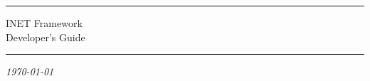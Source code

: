 

\begin{center}\end{center}
\vspace{16em}
\hrule
\vspace{2em}
\begin{center}
{\HUGE INET Framework}\\
\vspace{2em}
{\Huge Developer's Guide}\\
\end{center}
\vspace{2em}
\hrule

\begin{center}
\textit{\today}
\end{center}




